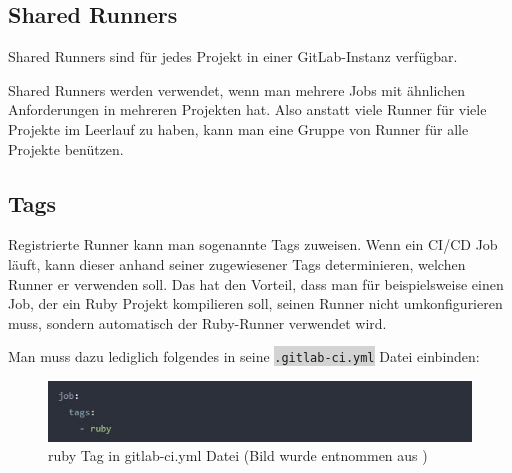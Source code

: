 \subsection{Shared Runners}

Shared Runners sind für jedes Projekt in einer GitLab-Instanz verfügbar.

Shared Runners werden verwendet, wenn man mehrere Jobs mit ähnlichen Anforderungen in mehreren Projekten hat. Also anstatt viele Runner für viele Projekte im Leerlauf zu haben, kann man eine Gruppe von Runner für alle Projekte benützen.\autocite{gitlabSharedRunner}

\subsection{Tags}

Registrierte Runner kann man sogenannte Tags zuweisen. Wenn ein CI/CD Job läuft, kann dieser anhand seiner zugewiesener Tags determinieren, welchen Runner er verwenden soll. Das hat den Vorteil, dass man für beispielsweise einen Job, der ein Ruby Projekt kompilieren soll, seinen Runner nicht umkonfigurieren muss, sondern automatisch der Ruby-Runner verwendet wird.

Man muss dazu lediglich folgendes in seine  \colorbox{lightgray}{\texttt{.gitlab-ci.yml}} Datei einbinden:

\begin{figure}[h]
	\centerline{
		\includegraphics{./grafiken/ruby_runner_tag_in_gitlab-ci-yml_file.JPG}
	}
	\vskip0pt
	\caption{ruby Tag in gitlab-ci.yml Datei (Bild wurde entnommen aus \autocite{gitlabRunner})}
\end{figure}

